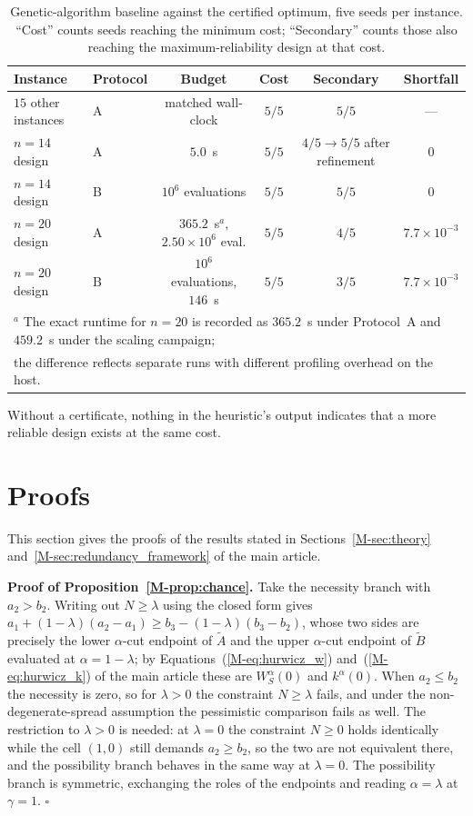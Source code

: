 \documentclass[11pt]{article}
\begin{document}
\begin{table}[!htbp]
\centering
\caption{Genetic-algorithm baseline against the certified optimum, five seeds per instance.
``Cost'' counts seeds reaching the minimum cost; ``Secondary'' counts those also reaching the
maximum-reliability design at that cost.}
\label{tab:baseline}
\small
\begin{tabular}{llcccc}
\hline
Instance & Protocol & Budget & Cost & Secondary & Shortfall\\
\hline
$15$ other instances & A & matched wall-clock & $5/5$ & $5/5$ & ---\\
$n=14$ design & A & $5.0$~s & $5/5$ & $4/5 \to 5/5$ after refinement & $0$\\
$n=14$ design & B & $10^{6}$ evaluations & $5/5$ & $5/5$ & $0$\\
$n=20$ design & A & $365.2$~s$^a$, $2.50\times10^{6}$ eval. & $5/5$ & $4/5$ & $7.7\times10^{-3}$\\
$n=20$ design & B & $10^{6}$ evaluations, $146$~s & $5/5$ & $3/5$ & $7.7\times10^{-3}$\\
\hline
\multicolumn{6}{l}{\footnotesize $^a$ The exact runtime for $n=20$ is recorded as $365.2$~s under Protocol~A and $459.2$~s under the scaling campaign;}\\
\multicolumn{6}{l}{\footnotesize \phantom{$^a$} the difference reflects separate runs with different profiling overhead on the host.}\\
\hline
\end{tabular}
\end{table}

Without a certificate, nothing in the heuristic's output indicates that a more reliable design exists
at the same cost.

\section{Proofs} \label{sec:supp_proofs}
This section gives the proofs of the results stated in Sections~\ref*{M-sec:theory}
and~\ref*{M-sec:redundancy_framework} of the main article.

\textbf{Proof of Proposition~\ref*{M-prop:chance}.} Take the necessity branch with $a_2 > b_2$. Writing out
$N \ge \lambda$ using the closed form gives
$a_1 + (1-\lambda)(a_2-a_1) \ge b_3 - (1-\lambda)(b_3-b_2)$, whose two sides are precisely the lower
$\alpha$-cut endpoint of $\tilde{A}$ and the upper $\alpha$-cut endpoint of $\tilde{B}$ evaluated at
$\alpha = 1-\lambda$; by Equations~(\ref*{M-eq:hurwicz_w}) and~(\ref*{M-eq:hurwicz_k}) of the main article these
are $W_S^{\alpha}(0)$ and $k^{\alpha}(0)$. When
$a_2 \le b_2$ the necessity is zero, so for $\lambda>0$ the constraint $N \ge \lambda$ fails, and under
the non-degenerate-spread assumption the pessimistic comparison fails as well. The restriction to
$\lambda>0$ is needed: at $\lambda=0$ the constraint $N \ge 0$ holds identically while the cell $(1,0)$
still demands $a_2 \ge b_2$, so the two are not equivalent there, and the possibility branch behaves in
the same way at $\lambda=0$. The possibility branch is symmetric, exchanging the roles of the
endpoints and reading $\alpha = \lambda$ at $\gamma=1$. $\square$
\end{document}
